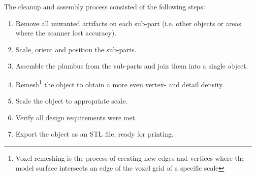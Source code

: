 \documentclass[12pt,a4paper]{article}
\begin{document}
The cleanup and assembly process consisted of the following steps:

\begin{enumerate}
  \item Remove all unwanted artifacts on each sub-part (i.e. other objects or
    areas where the scanner lost accuracy).
  \item Scale, orient and position the sub-parts.
  \item Assemble the plumbus from the sub-parts and join them into a single
    object.
  \item Remesh\footnote{Voxel remeshing is the process of creating new edges and
      vertices where the model surface intersects an edge of the voxel grid of a
    specific scale} the object to obtain a more even vertex- and detail density.
  \item Scale the object to appropriate scale.
  \item Verify all design requirements were met.
  \item Export the object as an STL file, ready for printing.
\end{enumerate}
\end{document}
